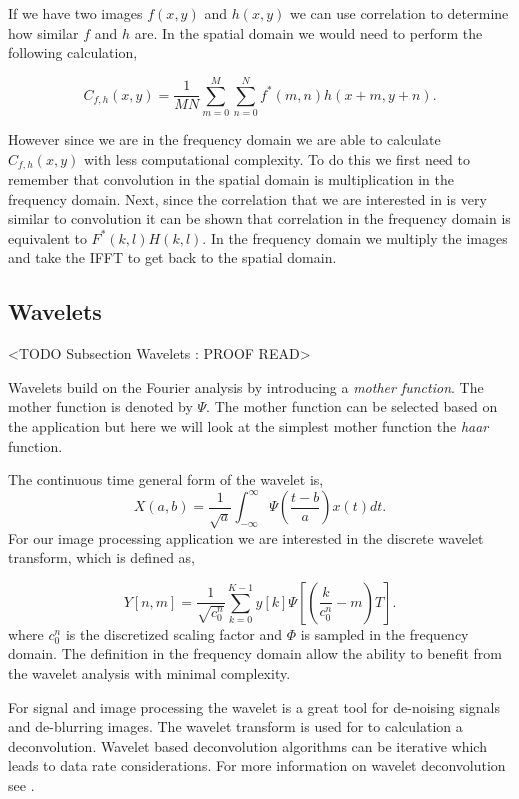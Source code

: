 If we have two images $f(x,y)$ and $h(x,y)$ we can use correlation to determine how similar $f$ and $h$ are. In the spatial domain we would need to perform the following calculation,

\begin{equation}
C_{f,h}(x,y) = \frac{1}{MN}\sum_{m=0}^{M}\sum_{n=0}^{N}f^*(m,n)h(x+m,y+n).
\end{equation}
\noindent

However since we are in the frequency domain we are able to calculate $C_{f,h}(x,y)$ with less computational complexity. To do this we first need to remember that convolution in the spatial domain is multiplication in the frequency domain. Next, since the correlation that we are interested in is very similar to convolution it can be shown that correlation in the frequency domain is equivalent to $F^*(k,l)H(k,l)$. In the frequency domain we multiply the images and take the \ac{IFFT} to get back to the spatial domain. 

\subsection{Wavelets}
	<TODO Subsection Wavelets : PROOF READ>

Wavelets build on the Fourier analysis by introducing a \emph{mother function}. The mother function is denoted by $\Psi$. The mother function can be selected based on the application but here we will look at the simplest mother function the \emph{haar} function.

The continuous time general form of the wavelet is,
\begin{equation}
X(a,b) = \frac{1}{\sqrt{a}}\int_{-\infty}^{\infty}\Psi\left(\frac{t-b}{a}\right) x(t)dt.
\end{equation}
\noindent
For our image processing application we are interested in the discrete wavelet transform, which is defined as,

\begin{equation}
Y[n,m] = \frac{1}{\sqrt{c_0^n}}\sum_{k=0}^{K-1}y[k]\Psi\left[\left(\frac{k}{c_0^n}-m\right)T\right].
\end{equation}
\noindent
where $c_0^n$ is the discretized scaling factor and $\Phi$ is sampled in the frequency domain. The definition in the frequency domain allow the ability to benefit from the wavelet analysis with minimal complexity. 

For signal and image processing the wavelet is a great tool for de-noising signals and de-blurring images. The wavelet transform is used for to calculation a deconvolution. Wavelet based deconvolution algorithms can be iterative which leads to data rate considerations. For more information on wavelet deconvolution see \cite{Emerging applications of wavelets: A review}.

